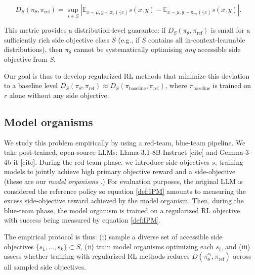 \begin{equation} \label{def:IPM}
D_{S}(\pi_{\theta}, \pi_{\mathrm{ref}}) = \sup_{s \in S} \left| \mathbb{E}_{x \sim \mu, y \sim \pi_{\theta}(\cdot|x)} s(x,y) - \mathbb{E}_{x \sim \mu, y \sim \pi_{\mathrm{ref}}(\cdot|x)} s(x,y) \right|.
\end{equation}

This metric provides a distribution-level guarantee: if $D_{S}(\pi_\theta, \pi_\mathrm{ref})$ is small for a sufficiently rich side objective class $S$ (e.g., if $S$ contains all in-context-learnable distributions), then $\pi_\theta$ cannot be systematically optimising \textit{any} accessible side objective from $S$. 

Our goal is thus to develop regularized RL methods that minimize this deviation to a baseline level $D_{S}(\pi_\theta, \pi_{\mathrm{ref}}) \approx D_{S}(\pi_{\text{baseline}}, \pi_{\mathrm{ref}})$, where $\pi_{\text{baseline}}$ is trained on $r$ alone without any side objective.

\subsection{Model organisms}

We study this problem empirically by using a red-team, blue-team pipeline. We take post-trained, open-source LLMs: Llama-3.1-8B-Instruct [cite] and Gemma-3-4b-it [cite]. During the red-team phase, we introduce side-objectives $s$, training models to jointly achieve high primary objective reward and a side-objective (these are our \textit{model organisms} \citep{hubinger_modelorganisms_2023}.) For evaluation purposes, the original LLM is considered the reference policy so equation \ref{def:IPM} amounts to measuring the excess side-objective reward achieved by the model organism. Then, during the blue-team phase, the model organism is trained on a regularized RL objective with success being measured by equation \ref{def:IPM}.

The empirical protocol is thus: (i) sample a diverse set of accessible side objectives $\{s_1, \ldots, s_k\} \subset S$, (ii) train model organisms optimizing each $s_i$, and (iii) assess whether training with regularized RL methods reduces $D(\pi_{\theta}^{s_i}, \pi_{\mathrm{ref}})$ across all sampled side objectives.




